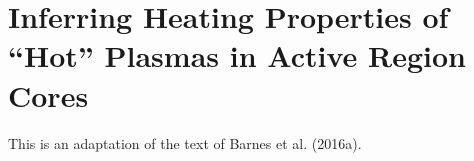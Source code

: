 \chapter{Inferring Heating Properties of ``Hot'' Plasmas in Active Region Cores}\label{ch:inferring_hot_plasma}

This is an adaptation of the text of Barnes et al. (2016a).